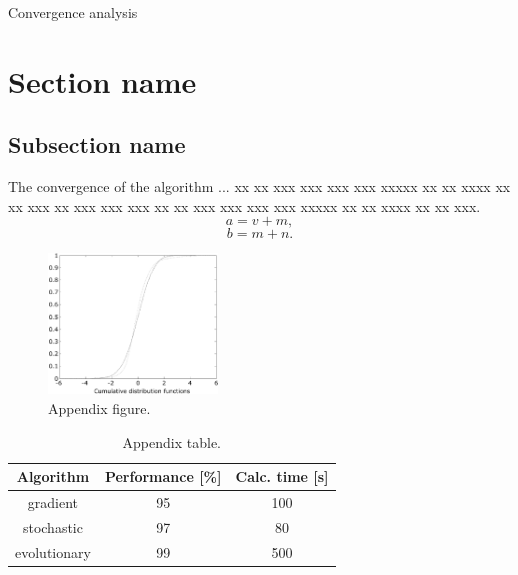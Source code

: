 \documentclass{amcs}
\begin{document}
\begin{appendices}{Convergence analysis}
\section{Section name}
\subsection{Subsection name}The convergence of the algorithm ... xx xx  xxx xxx xxx xxx xxxxx xx xx xxxx xx xx xxx  xx xxx xxx xxx xx xx  xxx xxx xxx xxx xxxxx  xx xx xxxx xx xx xxx.
\begin{equation}
  a=v+m,
\end{equation}
\begin{equation}
  b=m+n.
\end{equation}
\begin{figure}[!h]
  \includegraphics[width=0.40\textwidth]{figA1}
  \caption{Appendix figure.}
\end{figure}
\begin{table}[!h]
 \caption{Appendix table.}
 \begin{tabular}{|c|c|c|}
   \hline
   Algorithm & Performance [\%]& Calc. time [s]\\\hline\hline
   gradient & 95 & 100\\
   stochastic & 97 & 80\\
   evolutionary & 99 & 500\\\hline
 \end{tabular}
\end{table}

\begin{theorem}{}
\end{theorem}

\begin{lemma}{}
\end{lemma}

\begin{lemma}{}
\end{lemma}

\begin{lemma}{}
\end{lemma}
\end{appendices}
\end{document}
